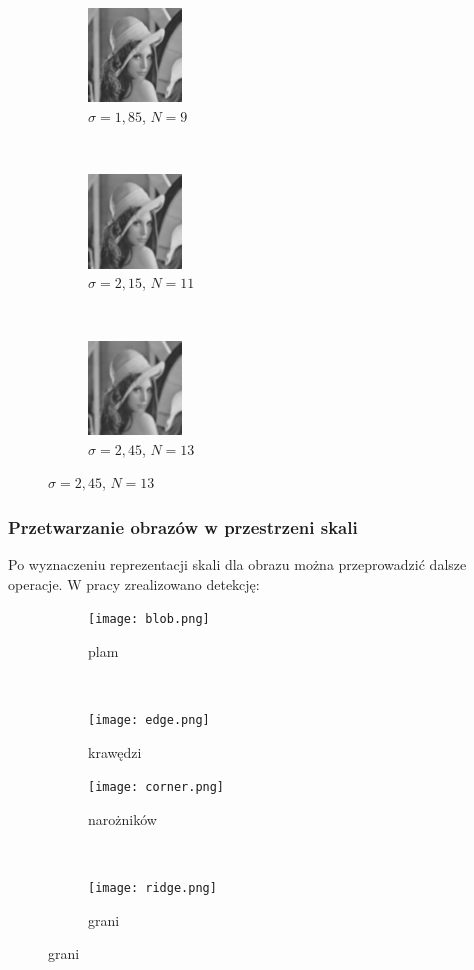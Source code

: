 \begin{frame}
\begin{figure}[h]
\begin{center}
			\begin{subfigure}[b]{3.5cm}
				\centering
				\includegraphics[width=2.5cm]{Lena_scales4.jpg}
				\caption{$\sigma = 1,85$, $N = 9$}
			\end{subfigure}
			~
			\begin{subfigure}[b]{3.5cm}
				\centering
				\includegraphics[width=2.5cm]{Lena_scales5.jpg}
				\caption{$\sigma = 2,15$, $N = 11$}
			\end{subfigure}
			~
			\begin{subfigure}[b]{3.5cm}
				\centering
				\includegraphics[width=2.5cm]{Lena_scales6.jpg}
				\caption{$\sigma = 2,45$, $N = 13$}
			\end{subfigure}
			\label{lena_scales}
		\end{center}
	\end{figure}
\end{frame}


\begin{frame}
	\frametitle{Przetwarzanie obrazów w przestrzeni skali}

	Po wyznaczeniu reprezentacji skali dla obrazu można przeprowadzić dalsze operacje. W pracy zrealizowano detekcję:	
	\begin{figure}[h]
		\begin{center}
			\begin{subfigure}[b]{5cm}
				\centering
				\texttt{[image: blob.png]}
				\caption{plam}
			\end{subfigure}
			~
			\begin{subfigure}[b]{5cm}
				\centering
				\texttt{[image: edge.png]}
				\caption{krawędzi}
			\end{subfigure}

			\begin{subfigure}[b]{5cm}
				\centering
				\texttt{[image: corner.png]}
				\caption{narożników}
			\end{subfigure}
			~
			\begin{subfigure}[b]{5cm}
				\centering
				\texttt{[image: ridge.png]}
				\caption{grani}
			\end{subfigure}
		\end{center}
	\end{figure}
\end{frame}


